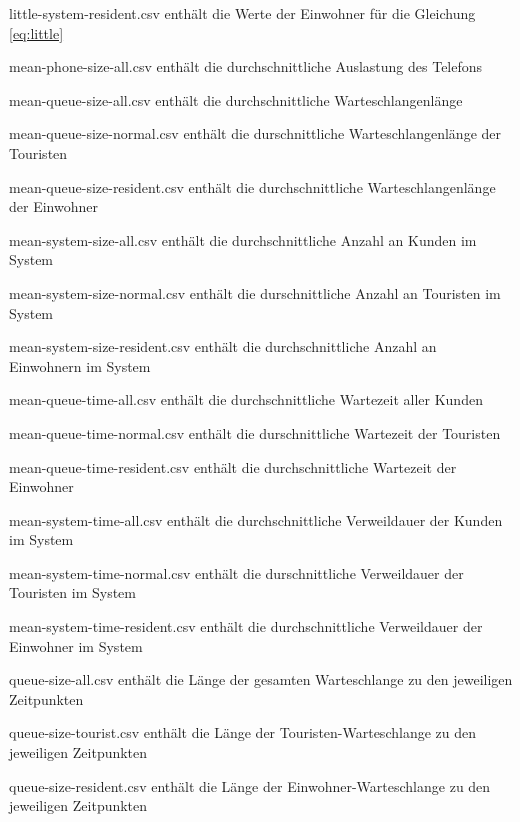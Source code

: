 \begin{list}{•}
    	\item little-system-resident.csv enthält die Werte der Einwohner für die Gleichung \ref{eq:little}
    	\item mean-phone-size-all.csv enthält die durchschnittliche Auslastung des Telefons
    	\item mean-queue-size-all.csv enthält die durchschnittliche Warteschlangenlänge
    	\item mean-queue-size-normal.csv enthält die durschnittliche Warteschlangenlänge der Touristen
    	\item mean-queue-size-resident.csv enthält die durchschnittliche Warteschlangenlänge der Einwohner
    	\item mean-system-size-all.csv enthält die durchschnittliche Anzahl an Kunden im System
    	\item mean-system-size-normal.csv enthält die durschnittliche Anzahl an Touristen im System
    	\item mean-system-size-resident.csv enthält die durchschnittliche Anzahl an Einwohnern im System
    	\item mean-queue-time-all.csv enthält die durchschnittliche Wartezeit aller Kunden
    	\item mean-queue-time-normal.csv enthält die durschnittliche Wartezeit der Touristen
    	\item mean-queue-time-resident.csv enthält die durchschnittliche Wartezeit der Einwohner		
    	\item mean-system-time-all.csv enthält die durchschnittliche Verweildauer der Kunden im System
    	\item mean-system-time-normal.csv enthält die durschnittliche Verweildauer der Touristen im System
    	\item mean-system-time-resident.csv enthält die durchschnittliche Verweildauer der Einwohner im System
    	\item queue-size-all.csv enthält die Länge der gesamten Warteschlange zu den jeweiligen Zeitpunkten	
    	\item queue-size-tourist.csv enthält die Länge der Touristen-Warteschlange zu den jeweiligen Zeitpunkten	
    	\item queue-size-resident.csv enthält die Länge der Einwohner-Warteschlange zu den jeweiligen Zeitpunkten
	
\end{list}
